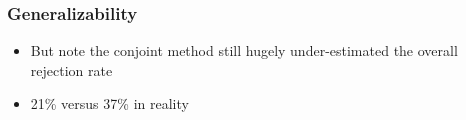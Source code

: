 \documentclass[xcolor=x11names,compress]{beamer}\usepackage[]{graphicx}\usepackage[]{color}
\renewcommand{\(}{\begin{columns}}
\renewcommand{\)}{\end{columns}}
\newcommand{\<}[1]{\begin{column}{#1}}
\renewcommand{\>}{\end{column}}
\begin{document}


\begin{frame}
\frametitle{Generalizability}
\begin{itemize}
\item But note the conjoint method still hugely under-estimated the overall rejection rate
\item 21\% versus 37\% in reality
\end{itemize}
\end{frame}
\end{document}

